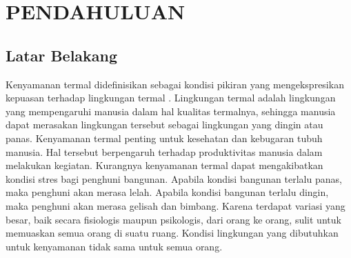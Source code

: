 \chapter{PENDAHULUAN}\label{pendahuluan}
\section{Latar Belakang}\label{latar belakang}



Kenyamanan termal didefinisikan sebagai kondisi pikiran yang mengekspresikan kepuasan terhadap lingkungan termal \cite{ASHRAE55}. Lingkungan termal adalah lingkungan yang mempengaruhi manusia dalam hal kualitas termalnya, sehingga manusia dapat merasakan lingkungan tersebut sebagai lingkungan yang dingin atau panas. Kenyamanan termal penting untuk kesehatan dan kebugaran tubuh manusia. Hal tersebut berpengaruh terhadap produktivitas manusia dalam melakukan kegiatan. Kurangnya kenyamanan termal dapat mengakibatkan kondisi stres bagi penghuni bangunan. Apabila kondisi bangunan terlalu panas, maka penghuni akan merasa lelah. Apabila kondisi bangunan terlalu dingin, maka penghuni akan merasa gelisah dan bimbang. Karena terdapat variasi yang besar, baik secara fisiologis maupun psikologis, dari orang ke orang, sulit untuk memuaskan semua orang di suatu ruang. Kondisi lingkungan yang dibutuhkan untuk kenyamanan tidak sama untuk semua orang. 

